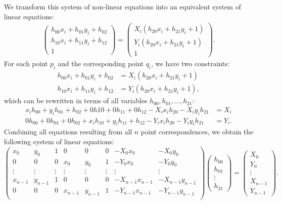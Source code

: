 \documentclass[11pt, oneside, reqno]{book}
\begin{document}
We transform this system of non-linear equations into an equivalent system of linear equations:
\begin{align}
\begin{pmatrix}
h_{00}x_i + h_{01}y_i + h_{02} \\[2 pt]
h_{10}x_i + h_{11}y_i + h_{12} \\
1
\end{pmatrix}
= \begin{pmatrix}
X_i \left( h_{20}x_i + h_{21}y_i + 1 \right)\\[2 pt]
Y_i \left( h_{20}x_i + h_{21}y_i + 1 \right)\\ 
1
\end{pmatrix}. \label{eq:Hp=q(Hp_2)}
\end{align}
For each point $p_i$ and the corresponding point $q_i$, we have two constraints:
\begin{align*}
h_{00}x_i + h_{01}y_i + h_{02} &= X_i\left( h_{20}x_i + h_{21}y_i + 1 \right) \\
h_{10}x_i + h_{11}y_i + h_{12} &= Y_i\left( h_{20}x_i + h_{21}y_i + 1 \right),
\end{align*}
which can be rewritten in terms of all variables $h_{00}, h_{01}, \dots, h_{21}$:
\begin{align*}
x_ih_{00} + y_ih_{01} + h_{02} + 0h{10} + 0h_{11} + 0h_{12} - X_ix_ih_{20} - X_iy_ih_{21} &= X_i \\
0h_{00} + 0h_{01} + 0h_{02} + x_ih_{10} + y_ih_{11} + h_{12} - Y_ix_ih_{20} - Y_iy_ih_{21} &= Y_i.
\end{align*}
Combining all equations resulting from all $n$ point correspondences, we obtain the following system of linear equations:
\[
\begin{pmatrix}
x_0 & y_0 & 1 & 0 & 0 & 0 & -X_0x_0 & -X_0y_0 \\[1 pt]
0 & 0 & 0 & x_0 & y_0 & 1 & -Y_0x_0 & -Y_0y_0 \\
\vdots & \vdots & \vdots & \vdots & \vdots & \vdots & \vdots & \vdots \\
x_{n-1} & y_{n-1} & 1 & 0 & 0 & 0 & -X_{n-1}x_{n-1} & -X_{n-1}y_{n-1} \\[1 pt]
0 & 0 & 0 & x_{n-1} & y_{n-1} & 1 & -Y_{n-1}x_{n-1} & -Y_{n-1}y_{n-1} \\
\end{pmatrix}
\begin{pmatrix}
h_{00} \\ h_{01} \\ \vdots \\ h_{21}
\end{pmatrix}
=
\begin{pmatrix}
X_0 \\ Y_0 \\ \vdots \\ X_{n-1} \\ Y_{n-1}
\end{pmatrix}.
\]
\end{document}
